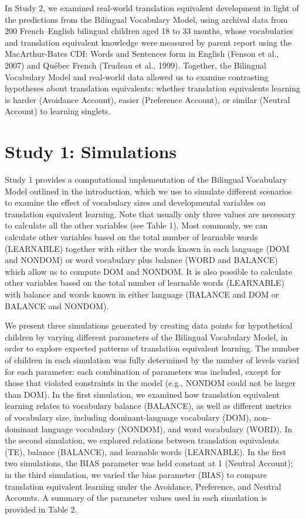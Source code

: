 \documentclass[
  english,
  ,man,floatsintext]{apa6}
\begin{document}
In Study 2, we examined real-world translation equivalent development in light of the predictions from the Bilingual Vocabulary Model, using archival data from 200 French--English bilingual children aged 18 to 33 months, whose vocabularies and translation equivalent knowledge were measured by parent report using the MacArthur-Bates CDI: Words and Sentences form in English (Fenson et al., 2007) and Québec French (Trudeau et al., 1999). Together, the Bilingual Vocabulary Model and real-world data allowed us to examine contrasting hypotheses about translation equivalents: whether translation equivalents learning is harder (Avoidance Account), easier (Preference Account), or similar (Neutral Account) to learning singlets.

\hypertarget{study-1-simulations}{%
\section{Study 1: Simulations}\label{study-1-simulations}}

Study 1 provides a computational implementation of the Bilingual Vocabulary Model outlined in the introduction, which we use to simulate different scenarios to examine the effect of vocabulary sizes and developmental variables on translation equivalent learning. Note that usually only three values are necessary to calculate all the other variables (see Table 1). Most commonly, we can calculate other variables based on the total number of learnable words (LEARNABLE) together with either the words known in each language (DOM and NONDOM) or word vocabulary plus balance (WORD and BALANCE) which allow us to compute DOM and NONDOM. It is also possible to calculate other variables based on the total number of learnable words (LEARNABLE) with balance and words known in either language (BALANCE and DOM or BALANCE and NONDOM).

We present three simulations generated by creating data points for hypothetical children by varying different parameters of the Bilingual Vocabulary Model, in order to explore expected patterns of translation equivalent learning. The number of children in each simulation was fully determined by the number of levels varied for each parameter: each combination of parameters was included, except for those that violated constraints in the model (e.g., NONDOM could not be larger than DOM). In the first simulation, we examined how translation equivalent learning relates to vocabulary balance (BALANCE), as well as different metrics of vocabulary size, including dominant-language vocabulary (DOM), non-dominant language vocabulary (NONDOM), and word vocabulary (WORD). In the second simulation, we explored relations between translation equivalents (TE), balance (BALANCE), and learnable words (LEARNABLE). In the first two simulations, the BIAS parameter was held constant at 1 (Neutral Account); in the third simulation, we varied the bias parameter (BIAS) to compare translation equivalent learning under the Avoidance, Preference, and Neutral Accounts. A summary of the parameter values used in each simulation is provided in Table 2.
\end{document}
